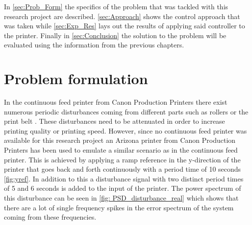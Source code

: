 \documentclass[journal]{IEEEtran}
\begin{document}
In \autoref{sec:Prob_Form} the specifics of the problem that was tackled with this research project are described. \autoref{sec:Approach} shows the control approach that was taken while \autoref{sec:Exp_Res} lays out the results of applying said controller to the printer. Finally in \autoref{sec:Conclusion} the solution to the problem will be evaluated using the information from the previous chapters.



\section{Problem formulation}\label{sec:Prob_Form}
In the continuous feed printer from Canon Production Printers there exist numerous periodic disturbances coming from different parts such as rollers or the print belt \cite{Challenge_Presentation}. These disturbances need to be attenuated in order to increase printing quality or printing speed. However, since no continuous feed printer was available for this research project an Arizona printer from Canon Production Printers has been used to emulate a similar scenario as in the continuous feed printer. This is achieved by applying a ramp reference in the y-direction of the printer that goes back and forth continuously with a period time of 10 seconds \autoref{fig:yref}. In addition to this a disturbance signal with two distinct period times of 5 and 6 seconds is added to the input of the printer. The power spectrum of this disturbance can be seen in \autoref{fig: PSD_disturbance_real} which shows that there are a lot of single frequency spikes in the error spectrum of the system coming from these frequencies.
\end{document}
